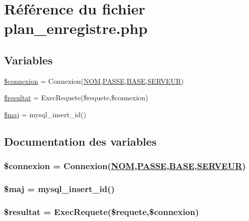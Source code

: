 \hypertarget{plan__enregistre_8php}{
\section{R\'{e}f\'{e}rence du fichier plan\_\-enregistre.php}
\label{plan__enregistre_8php}
}
\subsection*{Variables}
\begin{CompactItemize}
\item 
\hyperlink{plan__enregistre_8php_a0}{\$connexion} = Connexion(\hyperlink{pma__connect_8php_a0}{NOM},\hyperlink{pma__connect_8php_a1}{PASSE},\hyperlink{pma__connect_8php_a3}{BASE},\hyperlink{pma__connect_8php_a2}{SERVEUR})
\item 
\hyperlink{plan__enregistre_8php_a1}{\$resultat} = Exec\-Requete(\$requete,\$connexion)
\item 
\hyperlink{plan__enregistre_8php_a2}{\$maj} = mysql\_\-insert\_\-id()
\end{CompactItemize}


\subsection{Documentation des variables}
\hypertarget{plan__enregistre_8php_a0}{
\subsubsection[\$connexion]{\setlength{\rightskip}{0pt plus 5cm}\$connexion = Connexion(\hyperlink{pma__connect_8php_a0}{NOM},\hyperlink{pma__connect_8php_a1}{PASSE},\hyperlink{pma__connect_8php_a3}{BASE},\hyperlink{pma__connect_8php_a2}{SERVEUR})}}
\label{plan__enregistre_8php_a0}


\hypertarget{plan__enregistre_8php_a2}{
\subsubsection[\$maj]{\setlength{\rightskip}{0pt plus 5cm}\$maj = mysql\_\-insert\_\-id()}}
\label{plan__enregistre_8php_a2}


\hypertarget{plan__enregistre_8php_a1}{
\subsubsection[\$resultat]{\setlength{\rightskip}{0pt plus 5cm}\$resultat = Exec\-Requete(\$requete,\$connexion)}}
\label{plan__enregistre_8php_a1}


